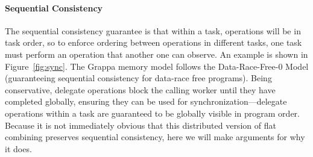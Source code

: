 

\paragraph{Sequential Consistency}
The sequential consistency guarantee is that within a task, operations will be in task order, so to enforce ordering between operations in different tasks, one task must perform an operation that another one can observe. An example is shown in Figure~\ref{fig:sync}.
The Grappa memory model follows the Data-Race-Free-0 Model (guaranteeing sequential consistency for data-race free programs). Being conservative, delegate operations block the calling worker until they have completed globally, ensuring they can be used for synchronization---delegate operations within a task are guaranteed to be globally visible in program order.
Because it is not immediately obvious that this distributed version of flat combining preserves sequential consistency, here we will make arguments for why it does.

